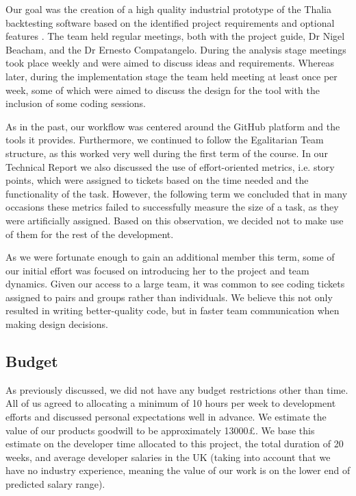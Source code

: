 \documentclass[main.tex]{subfiles}
\begin{document}
Our goal was the creation of a high quality industrial prototype of the Thalia backtesting software based on the identified project requirements \cite{TR_REQS} and optional features \cite{TR_OPTIONAL_FEATURES}. The team held regular meetings, both with the project guide, Dr Nigel Beacham, and the Dr Ernesto Compatangelo. During the analysis stage meetings took place weekly and were aimed to discuss ideas and requirements. Whereas later, during the implementation stage the team held meeting at least once per week, some of which were aimed to discuss the design for the tool with the inclusion of some coding sessions.

As in the past\cite{TR_TO}, our workflow was centered around the GitHub platform and the tools it provides.
Furthermore, we continued to follow the Egalitarian Team structure, as this worked very well during the first term of the course.
In our Technical Report \cite{TR_story} we also discussed the use of effort-oriented metrics, i.e. story points, which were assigned to tickets based on the time needed and the functionality of the task.
However, the following term we concluded that in many occasions these metrics failed to successfully measure the size of a task, as they were artificially assigned. Based on this observation, we decided not to make use of them for the rest of the development.

As we were fortunate enough to gain an additional member this term, some of our initial effort was focused on introducing her to the project and team dynamics. Given our access to a large team, it was common to see coding tickets assigned to pairs and groups rather than individuals. We believe this not only resulted in writing better-quality code, but in faster team communication when making design decisions.

\subsection{Budget}
As previously discussed, we did not have any budget restrictions other than time. All of us agreed to allocating a minimum of 10 hours per week to development efforts and discussed personal expectations well in advance.  We estimate the value of our products goodwill to be approximately 13000£. We base this estimate on the developer time allocated to this project, the total duration of 20 weeks, and average developer salaries in the UK\cite{DeveloperSalary} (taking into account that we have no industry experience, meaning the value of our work is on the lower end of predicted salary range).
\end{document}
